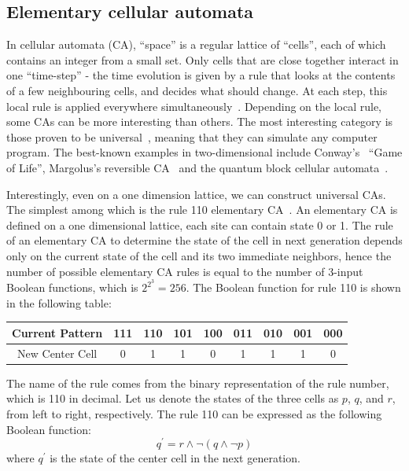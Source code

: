 \documentclass[twocolumn,superscriptaddress,english,showpacs,longbibliography]{revtex4-2}
\begin{document}
\subsection{Elementary cellular automata}\label{elementary-cellular-automata}
In cellular automata (CA), ``space'' is a regular lattice of ``cells'', each of which contains an integer from a small set.
Only cells that are close together interact in one ``time-step'' - the time evolution is given by a rule that looks at the contents of a few neighbouring cells, and decides what should change. At each step, this local rule is applied everywhere simultaneously~\cite{Margolus1984}.
Depending on the local rule, some CAs can be more interesting than others.
The most interesting category is those proven to be universal~\cite{Berlekamp2004}, meaning that they can simulate any computer program. The best-known examples in two-dimensional include Conway's~\cite{Games1970} ``Game of Life'', Margolus's reversible CA~\cite{Margolus1984} and the quantum block cellular automata~\cite{Arrighi2012}.

Interestingly, even on a one dimension lattice, we can construct universal CAs.
The simplest among which is the rule 110 elementary CA~\cite{Cook2009}.%
An elementary CA is defined on a one dimensional lattice, each site can contain state 0 or 1.
The rule of an elementary CA to determine the state of the cell in next generation depends only on the current state of the cell and its two immediate neighbors,
hence the number of possible elementary CA rules is equal to the number of 3-input Boolean functions, which is $2^{2^3} = 256$.
The Boolean function for rule 110 is shown in the following table:

\begin{tabular}{|c|c|c|c|c|c|c|c|c|}
\hline
Current Pattern & 111 & 110 & 101 & 100 & 011 & 010 & 001 & 000 \\
\hline
New Center Cell & 0 & 1 & 1 & 0 & 1 & 1 & 1 & 0 \\
\hline
\end{tabular}

The name of the rule comes from the binary representation of the rule number, which is 110 in decimal.
Let us denote the states of the three cells as $p$, $q$, and $r$, from left to right, respectively. The rule 110 can be expressed as the following Boolean function:
\begin{equation}\label{eq:110rule}
    q^\prime = r \land \neg (q \land \neg p)
\end{equation}
where $q^\prime$ is the state of the center cell in the next generation.
\end{document}
